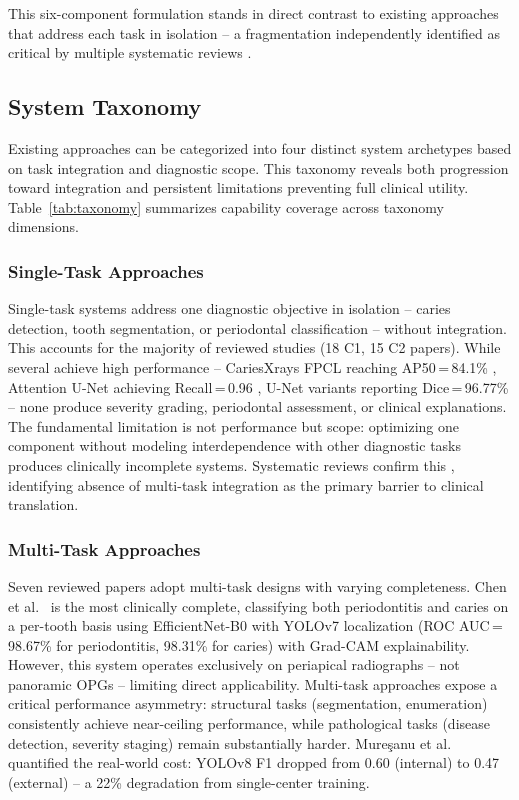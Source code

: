 \documentclass[conference]{IEEEtran}
\begin{document}
This six-component formulation stands in direct contrast to existing
approaches that address each task in isolation -- a fragmentation
independently identified as critical by multiple systematic reviews
\cite{iacob2025automated,albano2024artificial,bonfanti2025deep,
khubrani2025detection,zanini2024systematic,zhou2025deep}.

\subsection{System Taxonomy}

Existing approaches can be categorized into four distinct system
archetypes based on task integration and diagnostic scope. This taxonomy
reveals both progression toward integration and persistent limitations
preventing full clinical utility. Table~\ref{tab:taxonomy} summarizes
capability coverage across taxonomy dimensions.

\subsubsection{Single-Task Approaches}

Single-task systems address one diagnostic objective in isolation --
caries detection, tooth segmentation, or periodontal classification --
without integration. This accounts for the majority of reviewed studies
(18 C1, 15 C2 papers). While several achieve high performance --
CariesXrays FPCL reaching AP50\,=\,84.1\% \cite{chen2024cariesxrays},
Attention U-Net achieving Recall\,=\,0.96
\cite{pornprasertsuk2025clinical}, U-Net variants reporting
Dice\,=\,96.77\% \cite{vickram2025extraction} -- none produce severity
grading, periodontal assessment, or clinical explanations. The
fundamental limitation is not performance but scope: optimizing one
component without modeling interdependence with other diagnostic tasks
produces clinically incomplete systems. Systematic reviews confirm this
\cite{albano2024artificial,zanini2024systematic}, identifying absence
of multi-task integration as the primary barrier to clinical
translation.

\subsubsection{Multi-Task Approaches}

Seven reviewed papers adopt multi-task designs with varying
completeness. Chen et al.\ \cite{chen2023deep} is the most clinically
complete, classifying both periodontitis and caries on a per-tooth
basis using EfficientNet-B0 with YOLOv7 localization (ROC
AUC\,=\,98.67\% for periodontitis, 98.31\% for caries) with Grad-CAM
explainability. However, this system operates exclusively on periapical
radiographs -- not panoramic OPGs -- limiting direct applicability.
Multi-task approaches expose a critical performance asymmetry:
structural tasks (segmentation, enumeration) consistently achieve
near-ceiling performance, while pathological tasks (disease detection,
severity staging) remain substantially harder. Mure\c{s}anu et al.\
\cite{muresanu2024automating} quantified the real-world cost: YOLOv8
F1 dropped from 0.60 (internal) to 0.47 (external) -- a 22\%
degradation from single-center training.
\end{document}
